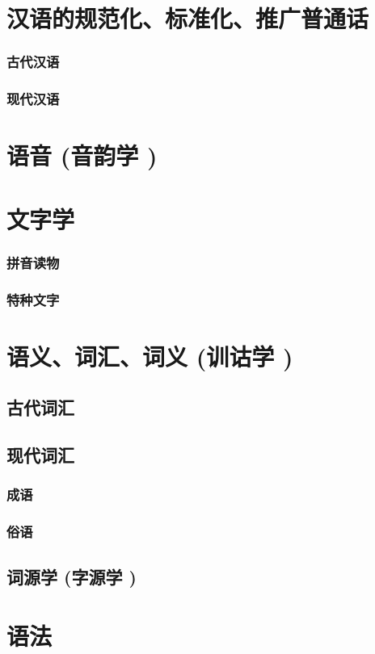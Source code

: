 \documentclass[UTF8]{../../RepresentationUniverse}
\begin{document}
\section{汉语的规范化、标准化、推广普通话}
    \subsubsection{古代汉语}
    \subsubsection{现代汉语}
\section{ 语音 (音韵学 )}
\section{文字学}
    \subsubsection{拼音读物}
    \subsubsection{特种文字}
\section{语义、词汇、词义 (训诂学 )}
    \subsection{古代词汇}
    \subsection{现代词汇}
        \subsubsection{成语}
        \subsubsection{俗语}
    \subsection{词源学 (字源学 )}
\section{语法}
\end{document}
